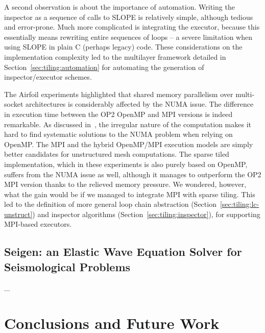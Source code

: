 A second observation is about the importance of automation. Writing the inspector as a sequence of calls to SLOPE is relatively simple, although tedious and error-prone. Much more complicated is integrating the executor, because this essentially means rewriting entire sequences of loops -- a severe limitation when using SLOPE in plain C (perhaps legacy) code. These considerations on the implementation complexity led to the multilayer framework detailed in Section~\ref{sec:tiling:automation} for automating the generation of inspector/executor schemes. 

The Airfoil experiments highlighted that shared memory parallelism over multi-socket architectures is considerably affected by the NUMA issue. The difference in execution time between the OP2 OpenMP and MPI versions is indeed remarkable. As discussed in~\cite{hydra-op2}, the irregular nature of the computation makes it hard to find systematic solutions to the NUMA problem when relying on OpenMP. The MPI and the hybrid OpenMP/MPI execution models are simply better candidates for unstructured mesh computations. The sparse tiled implementation, which in these experiments is also purely based on OpenMP, suffers from the NUMA issue as well, although it manages to outperform the OP2 MPI version thanks to the relieved memory pressure. We wondered, however, what the gain would be if we managed to integrate MPI with sparse tiling. This led to the definition of more general loop chain abstraction (Section~\ref{sec:tiling:lc-unstruct}) and inspector algorithms (Section~\ref{sec:tiling:inspector}), for supporting MPI-based executors.

\subsection{Seigen: an Elastic Wave Equation Solver for Seismological Problems}
\label{sec:tiling:seigen}
...

\section{Conclusions and Future Work}
